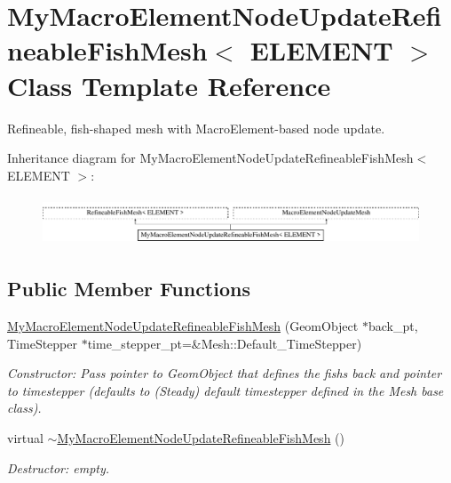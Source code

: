 \hypertarget{classMyMacroElementNodeUpdateRefineableFishMesh}{}\section{My\+Macro\+Element\+Node\+Update\+Refineable\+Fish\+Mesh$<$ E\+L\+E\+M\+E\+NT $>$ Class Template Reference}
\label{classMyMacroElementNodeUpdateRefineableFishMesh}


Refineable, fish-\/shaped mesh with Macro\+Element-\/based node update.  


Inheritance diagram for My\+Macro\+Element\+Node\+Update\+Refineable\+Fish\+Mesh$<$ E\+L\+E\+M\+E\+NT $>$\+:\begin{figure}[H]
\begin{center}
\leavevmode
\includegraphics[height=1.454545cm]{classMyMacroElementNodeUpdateRefineableFishMesh}
\end{center}
\end{figure}
\subsection*{Public Member Functions}
\begin{DoxyCompactItemize}
\item 
\hyperlink{classMyMacroElementNodeUpdateRefineableFishMesh_aed0e3ba11f8a2b098ba4e23814135132}{My\+Macro\+Element\+Node\+Update\+Refineable\+Fish\+Mesh} (Geom\+Object $\ast$back\+\_\+pt, Time\+Stepper $\ast$time\+\_\+stepper\+\_\+pt=\&Mesh\+::\+Default\+\_\+\+Time\+Stepper)
\begin{DoxyCompactList}\small\item\em Constructor\+: Pass pointer to Geom\+Object that defines the fish\textquotesingle{}s back and pointer to timestepper (defaults to (Steady) default timestepper defined in the Mesh base class). \end{DoxyCompactList}\item 
virtual \hyperlink{classMyMacroElementNodeUpdateRefineableFishMesh_af125f6a37aedce2fa19309d2908c1b3c}{$\sim$\+My\+Macro\+Element\+Node\+Update\+Refineable\+Fish\+Mesh} ()
\begin{DoxyCompactList}\small\item\em Destructor\+: empty. \end{DoxyCompactList}\end{DoxyCompactItemize}


